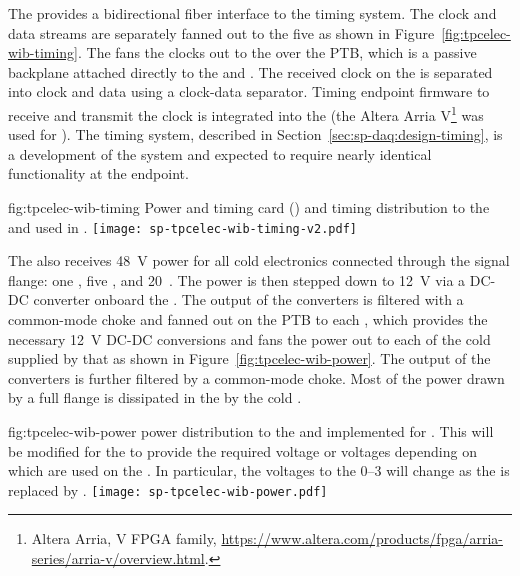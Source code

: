 The   provides a bidirectional fiber interface to the
timing system. The clock and data
streams are separately fanned out to the five  as shown in
Figure~\ref{fig:tpcelec-wib-timing}. The  fans the clocks out to the  over the
PTB, which is a passive backplane attached directly to the  and
.  The received clock on the  is separated into clock and
data using a clock-data separator. Timing endpoint firmware to receive and transmit
the clock is integrated into the   (the Altera Arria V\footnote{Altera Arria\texttrademark{}, V FPGA family, \url{https://www.altera.com/products/fpga/arria-series/arria-v/overview.html}.} was used for ).
The  timing system, described in Section~\ref{sec:sp-daq:design-timing}, is a development of the  system and expected to require nearly identical functionality at the  endpoint.

\begin{dunefigure}
{fig:tpcelec-wib-timing}
{Power and timing card () and timing distribution to the  and  used in .}
\texttt{[image: sp-tpcelec-wib-timing-v2.pdf]}
\end{dunefigure}

The  also receives \SI{48}{V}  power for all cold
electronics connected through the  signal flange: one , five , and \num{20}~. The  power is then stepped down
to \SI{12}{V} via a DC-DC converter onboard the . The output of the  converters is filtered with a common-mode choke and fanned out
on the PTB to each , which provides the necessary \SI{12}{V} DC-DC conversions and fans
the  power out to each of the cold  supplied by that  
as shown in Figure~\ref{fig:tpcelec-wib-power}. The output of the  converters is further filtered by a common-mode choke. Most of the power drawn by a full flange is dissipated in the  by the cold .

\begin{dunefigure}
{fig:tpcelec-wib-power}
{ power distribution to the  and  implemented for . This will be modified for the  to provide the required voltage or voltages depending on which  are used on the . In particular, the voltages to the  \numrange{0}{3} will change as the   is replaced by . }
\texttt{[image: sp-tpcelec-wib-power.pdf]}
\end{dunefigure}

